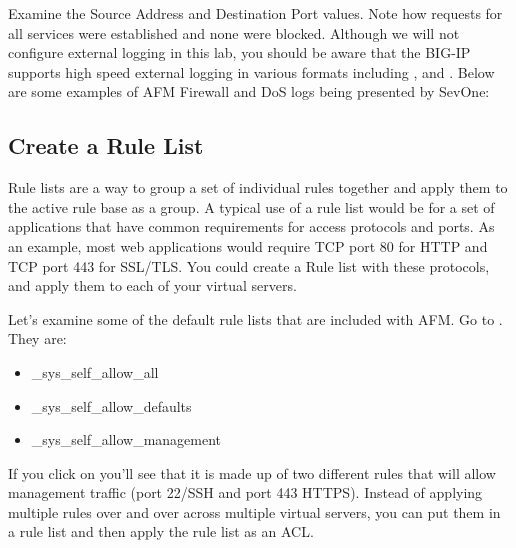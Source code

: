 \documentclass[letterpaper,10pt,english]{sphinxmanual}
\begin{document}
Examine the Source Address and Destination Port values. Note how
requests for all services were established and none were blocked.
Although we will not configure external logging in this lab, you should
be aware that the BIG-IP supports high speed external logging in various
formats including ,  and . Below
are some examples of AFM Firewall and DoS logs being presented by
SevOne:



\subsection{Create a Rule List}
\label{\detokenize{class1/module1/lab3:create-a-rule-list}}
Rule lists are a way to group a set of individual rules together and
apply them to the active rule base as a group. A typical use of a rule
list would be for a set of applications that have common requirements
for access protocols and ports. As an example, most web applications
would require TCP port 80 for HTTP and TCP port 443 for SSL/TLS. You
could create a Rule list with these protocols, and apply them to each of
your virtual servers.

Let’s examine some of the default rule lists that are included with AFM.
Go to . They are:
\begin{itemize}
\item {} 
\_sys\_self\_allow\_all

\item {} 
\_sys\_self\_allow\_defaults

\item {} 
\_sys\_self\_allow\_management

\end{itemize}


If you click on  you’ll see that it
is made up of two different rules that will allow management traffic
(port 22/SSH and port 443 HTTPS). Instead of applying multiple rules
over and over across multiple virtual servers, you can put them in a
rule list and then apply the rule list as an ACL.

\end{document}
